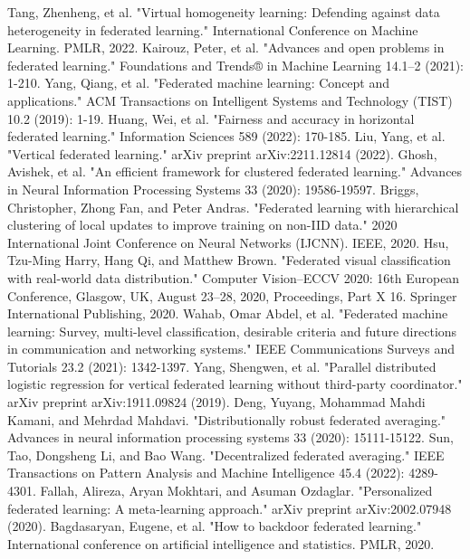 \documentclass[conference]{IEEEtran}
\begin{document}
\begin{thebibliography}{00}
     Tang, Zhenheng, et al. "Virtual homogeneity learning: Defending against data heterogeneity in federated learning." International Conference on Machine Learning. PMLR, 2022.
     Kairouz, Peter, et al. "Advances and open problems in federated learning." Foundations and Trends® in Machine Learning 14.1–2 (2021): 1-210.
     Yang, Qiang, et al. "Federated machine learning: Concept and applications." ACM Transactions on Intelligent Systems and Technology (TIST) 10.2 (2019): 1-19.
     Huang, Wei, et al. "Fairness and accuracy in horizontal federated learning." Information Sciences 589 (2022): 170-185.
     Liu, Yang, et al. "Vertical federated learning." arXiv preprint arXiv:2211.12814 (2022).
     Ghosh, Avishek, et al. "An efficient framework for clustered federated learning." Advances in Neural Information Processing Systems 33 (2020): 19586-19597.
     Briggs, Christopher, Zhong Fan, and Peter Andras. "Federated learning with hierarchical clustering of local updates to improve training on non-IID data." 2020 International Joint Conference on Neural Networks (IJCNN). IEEE, 2020.
     Hsu, Tzu-Ming Harry, Hang Qi, and Matthew Brown. "Federated visual classification with real-world data distribution." Computer Vision–ECCV 2020: 16th European Conference, Glasgow, UK, August 23–28, 2020, Proceedings, Part X 16. Springer International Publishing, 2020.
     Wahab, Omar Abdel, et al. "Federated machine learning: Survey, multi-level classification, desirable criteria and future directions in communication and networking systems." IEEE Communications Surveys and Tutorials 23.2 (2021): 1342-1397.
     Yang, Shengwen, et al. "Parallel distributed logistic regression for vertical federated learning without third-party coordinator." arXiv preprint arXiv:1911.09824 (2019).
     Deng, Yuyang, Mohammad Mahdi Kamani, and Mehrdad Mahdavi. "Distributionally robust federated averaging." Advances in neural information processing systems 33 (2020): 15111-15122.
     Sun, Tao, Dongsheng Li, and Bao Wang. "Decentralized federated averaging." IEEE Transactions on Pattern Analysis and Machine Intelligence 45.4 (2022): 4289-4301.
     Fallah, Alireza, Aryan Mokhtari, and Asuman Ozdaglar. "Personalized federated learning: A meta-learning approach." arXiv preprint arXiv:2002.07948 (2020).  
     Bagdasaryan, Eugene, et al. "How to backdoor federated learning." International conference on artificial intelligence and statistics. PMLR, 2020.  

\end{thebibliography}
\end{document}
